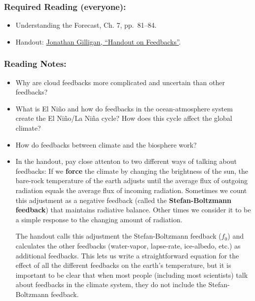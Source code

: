 \documentclass[
]{article}
\providecommand{\tightlist}{%
  \setlength{\itemsep}{0pt}\setlength{\parskip}{0pt}}
\begin{document}
\hypertarget{required-reading-everyone-6}{%
\subsubsection{Required Reading
(everyone):}\label{required-reading-everyone-6}}

\begin{itemize}
\tightlist
\item
  Understanding the Forecast, Ch. 7, pp.~81--84.
\item
  Handout: \href{/files/reading_handouts/Feedback_Handout.pdf}{Jonathan
  Gilligan, ``Handout on Feedbacks''}.
\end{itemize}

\hypertarget{reading-notes-6}{%
\subsubsection{Reading Notes:}\label{reading-notes-6}}

\begin{itemize}
\item
  Why are cloud feedbacks more complicated and uncertain than other
  feedbacks?
\item
  What is El Niño and how do feedbacks in the ocean-atmosphere system
  create the El Niño/La Niña cycle? How does this cycle affect the
  global climate?
\item
  How do feedbacks between climate and the biosphere work?
\item
  In the handout, pay close attenton to two different ways of talking
  about feedbacks: If we \textbf{force} the climate by changing the
  brightness of the sun, the bare-rock temperature of the earth adjusts
  until the average flux of outgoing radiation equals the average flux
  of incoming radiation. Sometimes we count this adjustment as a
  negative feedback (called the \textbf{Stefan-Boltzmann feedback}) that
  maintains radiative balance. Other times we consider it to be a simple
  response to the changing amount of radiation.

  The handout calls this adjustment the Stefan-Boltzmann feedback
  (\(f_0\)) and calculates the other feedbacks (water-vapor, lapse-rate,
  ice-albedo, etc.) as additional feedbacks. This lets us write a
  straightforward equation for the effect of all the different feedbacks
  on the earth's temperature, but it is important to be clear that when
  most people (including most scientists) talk about feedbacks in the
  climate system, they do not include the Stefan-Boltzmann feedback.
\end{itemize}
\end{document}
